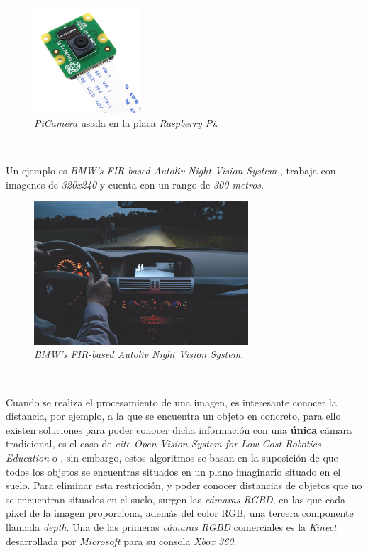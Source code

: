 \begin{figure} [h!]
	\begin{center}
		\includegraphics[width=4cm]{figs/picamera}
	\end{center}
	\caption{\textit{PiCamera} usada en la placa \textit{Raspberry Pi}.}
	\label{fig:picamera}
\end{figure}\

Un ejemplo es \textit{BMW's FIR-based Autoliv Night Vision System} \cite{nightvision}, trabaja con imagenes de \textit{320x240} y cuenta con un rango de \textit{300 metros}.\\

\begin{figure} [h!]
	\begin{center}
		\includegraphics[width=8cm]{figs/nightvision}
	\end{center}
	\caption{\textit{BMW's FIR-based Autoliv Night Vision System}.}
	\label{fig:nightvision}
\end{figure}\

Cuando se realiza el procesamiento de una imagen, es interesante conocer la distancia, por ejemplo, a la que se encuentra un objeto en concreto, para ello existen soluciones para poder conocer dicha información con una \textbf{única} cámara tradicional, es el caso de \textit{cite Open Vision System for Low-Cost Robotics Education} o \cite{distanceopencv}, sin embargo, estos algoritmos se basan en la suposición de que todos los objetos se encuentras situados en un plano imaginario situado en el suelo. Para eliminar esta restricción, y poder conocer distancias de objetos que no se encuentran situados en el suelo, surgen las \textit{cámaras RGBD}, en las que cada píxel de la imagen proporciona, además del color RGB, una tercera componente llamada \textit{depth}. Una de las primeras \textit{cámaras RGBD} comerciales es la \textit{Kinect} desarrollada por \textit{Microsoft} para su consola \textit{Xbox 360}.\\

